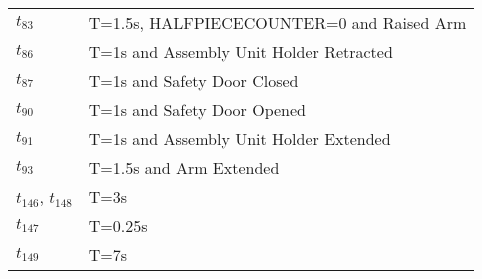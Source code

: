 \begin{longtable}{M{5cm}M{10cm}}
\hyperlink{completeNet:tt83}{\hypertarget{completeTable:tt83}{$t_{83}$}} & T=1.5s, HALFPIECECOUNTER=0 and Raised Arm\\
\hyperlink{completeNet:tt86}{\hypertarget{completeTable:tt86}{$t_{86}$}} & T=1s and Assembly Unit Holder Retracted\\
\hyperlink{completeNet:tt87}{\hypertarget{completeTable:tt87}{$t_{87}$}} & T=1s and Safety Door Closed\\
\hyperlink{completeNet:tt90}{\hypertarget{completeTable:tt90}{$t_{90}$}} & T=1s and Safety Door Opened\\
\hyperlink{completeNet:tt91}{\hypertarget{completeTable:tt91}{$t_{91}$}} & T=1s and Assembly Unit Holder Extended\\
\hyperlink{completeNet:tt93}{\hypertarget{completeTable:tt93}{$t_{93}$}} & T=1.5s and Arm Extended\\
\hyperlink{completeNet:tt146}{\hypertarget{completeTable:tt146}{$t_{146}$}}, \hyperlink{completeNet:tt148}{\hypertarget{completeTable:tt148}{$t_{148}$}} & T=3s\\
\hyperlink{completeNet:tt147}{\hypertarget{completeTable:tt147}{$t_{147}$}} & T=0.25s\\
\hyperlink{completeNet:tt149}{\hypertarget{completeTable:tt149}{$t_{149}$}} & T=7s\\
\end{longtable}
